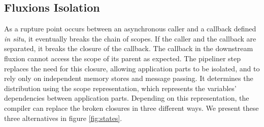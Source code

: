 \subsection{Fluxions Isolation} \label{chapter5:flx:isolation}

As a rupture point occurs between an asynchronous caller and a callback defined \textit{in situ}, it eventually breaks the chain of scopes.
If the caller and the callback are separated, it breaks the closure of the callback.
The callback in the downstream fluxion cannot access the scope of its parent as expected. %
The pipeliner step replaces the need for this closure, allowing application parts to be isolated, and to rely only on independent memory stores and message passing.
It determines the distribution using the scope representation, which represents the variables' dependencies between application parts.
Depending on this representation, the compiler can replace the broken closures in three different ways.
We present these three alternatives in figure \ref{fig:states}.

\begin{figure}[h!]


\end{figure}

